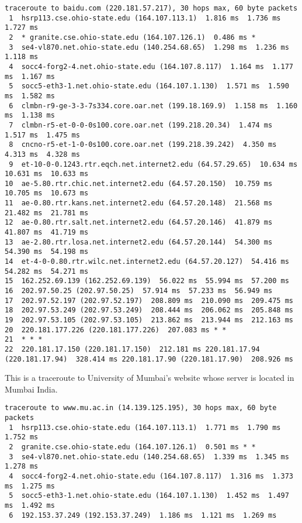 \documentclass[12pt]{article}
\begin{document}
\begin{singlespace}
\begin{enumerate}
\begin{itemize}
\begin{lstlisting}[basicstyle=\ttfamily\scriptsize]
% traceroute baidu.com
traceroute to baidu.com (220.181.57.217), 30 hops max, 60 byte packets
 1  hsrp113.cse.ohio-state.edu (164.107.113.1)  1.816 ms  1.736 ms  1.727 ms
 2  * granite.cse.ohio-state.edu (164.107.126.1)  0.486 ms *
 3  se4-vl870.net.ohio-state.edu (140.254.68.65)  1.298 ms  1.236 ms  1.118 ms
 4  socc4-forg2-4.net.ohio-state.edu (164.107.8.117)  1.164 ms  1.177 ms  1.167 ms
 5  socc5-eth3-1.net.ohio-state.edu (164.107.1.130)  1.571 ms  1.590 ms  1.582 ms
 6  clmbn-r9-ge-3-3-7s334.core.oar.net (199.18.169.9)  1.158 ms  1.160 ms  1.138 ms
 7  clmbn-r5-et-0-0-0s100.core.oar.net (199.218.20.34)  1.474 ms  1.517 ms  1.475 ms
 8  cncno-r5-et-1-0-0s100.core.oar.net (199.218.39.242)  4.350 ms  4.313 ms  4.328 ms
 9  et-10-0-0.1243.rtr.eqch.net.internet2.edu (64.57.29.65)  10.634 ms  10.631 ms  10.633 ms
10  ae-5.80.rtr.chic.net.internet2.edu (64.57.20.150)  10.759 ms  10.705 ms  10.673 ms
11  ae-0.80.rtr.kans.net.internet2.edu (64.57.20.148)  21.568 ms  21.482 ms  21.781 ms
12  ae-0.80.rtr.salt.net.internet2.edu (64.57.20.146)  41.879 ms  41.807 ms  41.719 ms
13  ae-2.80.rtr.losa.net.internet2.edu (64.57.20.144)  54.300 ms  54.390 ms  54.198 ms
14  et-4-0-0.80.rtr.wilc.net.internet2.edu (64.57.20.127)  54.416 ms  54.282 ms  54.271 ms
15  162.252.69.139 (162.252.69.139)  56.022 ms  55.994 ms  57.200 ms
16  202.97.50.25 (202.97.50.25)  57.914 ms  57.233 ms  56.949 ms
17  202.97.52.197 (202.97.52.197)  208.809 ms  210.090 ms  209.475 ms
18  202.97.53.249 (202.97.53.249)  208.444 ms  206.062 ms  205.848 ms
19  202.97.53.105 (202.97.53.105)  213.862 ms  213.944 ms  212.163 ms
20  220.181.177.226 (220.181.177.226)  207.083 ms * *
21  * * *
22  220.181.17.150 (220.181.17.150)  212.181 ms 220.181.17.94 (220.181.17.94)  328.414 ms 220.181.17.90 (220.181.17.90)  208.926 ms
		\end{lstlisting}
	This is a traceroute to University of Mumbai's website whose server is located in Mumbai India.
		\begin{lstlisting}[basicstyle=\ttfamily\scriptsize]
% traceroute www.mu.ac.in
traceroute to www.mu.ac.in (14.139.125.195), 30 hops max, 60 byte packets
 1  hsrp113.cse.ohio-state.edu (164.107.113.1)  1.771 ms  1.790 ms  1.752 ms
 2  granite.cse.ohio-state.edu (164.107.126.1)  0.501 ms * *
 3  se4-vl870.net.ohio-state.edu (140.254.68.65)  1.339 ms  1.345 ms  1.278 ms
 4  socc4-forg2-4.net.ohio-state.edu (164.107.8.117)  1.316 ms  1.373 ms  1.275 ms
 5  socc5-eth3-1.net.ohio-state.edu (164.107.1.130)  1.452 ms  1.497 ms  1.492 ms
 6  192.153.37.249 (192.153.37.249)  1.186 ms  1.121 ms  1.269 ms

\end{lstlisting}
\end{itemize}
\end{enumerate}
\end{singlespace}
\end{document}
